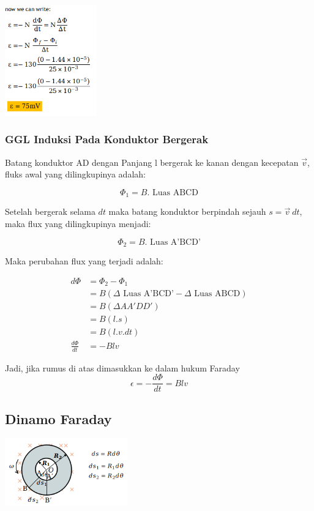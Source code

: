 \documentclass[twocolumn, 11pt]{article}%
\begin{document}
\begin{center}
    \includegraphics[width=150px]{6.png}
\end{center}

\subsubsection{GGL Induksi Pada Konduktor Bergerak}%

Batang konduktor AD dengan Panjang l bergerak ke kanan dengan kecepatan
$\vec v$, fluks awal yang dilingkupinya adalah:

\[ \Phi_1 = B.\text{ Luas ABCD} \]

Setelah bergerak selama $dt$ maka batang konduktor berpindah sejauh
$s=\vec v\ dt$, maka flux yang dilingkupinya menjadi:

\[ \Phi_2 = B.\text{ Luas A'BCD'} \]

Maka perubahan flux yang terjadi adalah:

\begin{align*}
    d\Phi &= \Phi_2 -\Phi_1\\
          &= B(\Delta \text{ Luas A'BCD'}-\Delta \text{ Luas ABCD})\\
          &= B(\Delta AA'DD')\\
          &= B(l.s)\\
          &= B(l.v.dt)\\
    \frac{d\Phi}{dt} &= -Blv
\end{align*}

Jadi, jika rumus di atas dimasukkan ke dalam hukum Faraday
\[\epsilon = -\frac{d\Phi}{dt} = Blv \]

\subsection{Dinamo Faraday}%
\begin{center}
    \includegraphics[width=200px]{8.png}
\end{center}
\end{document}
